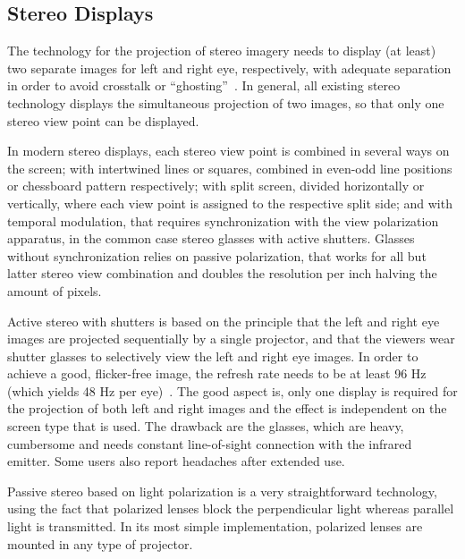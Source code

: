 \subsection{Stereo Displays}
\label{sec.stereo_displays}

The technology for the projection of stereo imagery needs to display (at least) two separate images for left and right eye, respectively, with adequate separation in order to avoid crosstalk or “ghosting”~\cite{Fernando2004}. In general, all existing stereo technology displays the simultaneous projection of two images, so that only one stereo view point can be displayed. 


In modern stereo displays, each stereo view point is combined in several ways on the screen; with intertwined lines or squares, combined in even-odd line positions or chessboard pattern respectively; with split screen, divided horizontally or vertically, where each view point is assigned to the respective split side; and with temporal modulation, that requires synchronization with the view polarization apparatus, in the common case stereo glasses with active shutters. Glasses without synchronization relies on passive polarization, that works for all but latter stereo view combination and doubles the resolution per inch halving the amount of pixels.

Active stereo with shutters is based on the principle that the left and right eye images are projected sequentially by a single projector, and that the viewers wear shutter glasses to selectively view the left and right eye images. In order to achieve a good, flicker-free image, the refresh rate needs to be at least 96 Hz (which yields 48 Hz per eye)~\cite{Fernando2004}. The good aspect is, only one display is required for the projection of both left and right images and the effect is independent on the screen type that is used. The drawback are the glasses, which are heavy, cumbersome and needs constant line-of-sight connection with the infrared emitter. Some users also report headaches after extended use.

Passive stereo based on light polarization is a very straightforward technology, using the fact that polarized lenses block the perpendicular light whereas parallel light is transmitted. In its most simple implementation, polarized lenses are mounted in any type of projector. 

